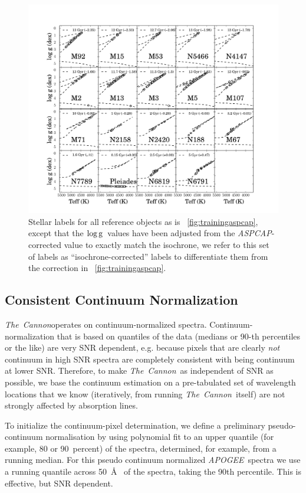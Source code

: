 \documentclass[12pt, preprint]{aastex}
\newcommand{\tc}{\textsl{The~Cannon}}
\newcommand{\apogee}{\textsl{APOGEE}}
\newcommand{\aspcap}{\textsl{ASPCAP}}
\newcommand{\logg}{\mbox{$\rm \log g$}}
\begin{document}
\begin{figure}[h!]
\centering
  \includegraphics[scale=0.31]{./plots/training_mkn2.pdf}
\caption{Stellar labels for all reference objects as is \figurename~\ref{fig:trainingaspcap}, except that the \logg\ values have been adjusted from the \aspcap-corrected value to exactly match the isochrone, we refer to this set of labels as  ``isochrone-corrected'' labels to differentiate them from the correction in \figurename~\ref{fig:trainingaspcap}.  }
\label{fig:trainingisochrone}
\end{figure}

\subsection{Consistent Continuum Normalization}\label{sec:ContNorm}

\tc operates on continuum-normalized spectra.
Continuum-normalization that is based on quantiles of the data (medians or 90-th percentiles or the like)
are very SNR dependent, e.g. because pixels that are clearly \emph{not} continuum in high SNR
spectra are completely consistent with being continuum at lower SNR.
Therefore, to make \tc\ as independent of SNR as possible,
we base the continuum estimation on a pre-tabulated set of wavelength locations that we know
(iteratively, from running \tc\ itself) are not strongly affected by absorption lines.

To initialize the continuum-pixel determination,
we define a preliminary pseudo-continuum normalisation by 
using polynomial fit to an upper quantile (for example, 80 or 90~percent) of the spectra, determined, for example, from a running median. For this pseudo continuum normalized \apogee\ spectra we use a running quantile across 50~\AA~ of the spectra, taking the 90th percentile. This is effective, but SNR dependent.
  
\end{document}

